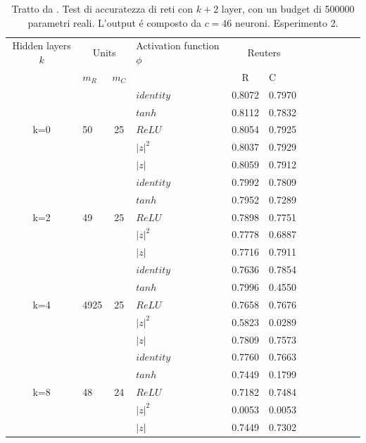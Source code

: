 \documentclass[a4paper,12pt]{report}
\begin{document}
 \newpage
 
 \begin{table}[h]
  \centering
  \begin{tabular}{cp{} cp{} cp{}   cp{} cp{} cp{}}
   \cline{1-6}
   Hidden layers $k$ & \multicolumn{2}{c}{Units} $p_R$ & Activation function $\phi$ & \multicolumn{2}{c}{Reuters}\\
   \cline{2-3} \cline{5-6}
   & $m_R$ & $m_C$ & & R & C \\
   \cline{1-6}
   & & & $identity$ & 0.8072 & 0.7970 \\
   \cline{4-6}
   & & & $tanh$ & 0.8112 & 0.7832 \\
   \cline{4-6}
   k=0 & 50 & 25 & $ReLU$ & 0.8054 & 0.7925 \\
   \cline{4-6}
   & & & $|z|^2$ & 0.8037 & 0.7929 \\
   \cline{4-6}
   & & & $|z|$ & 0.8059 & 0.7912 \\
   \cline{1-6}
   
   \cline{1-6}
   & & & $identity$ & 0.7992 & 0.7809 \\
   \cline{4-6}
   & & & $tanh$ & 0.7952 & 0.7289 \\
   \cline{4-6}
   k=2 & 49 & 25 & $ReLU$ & 0.7898 & 0.7751 \\
   \cline{4-6}
   & & & $|z|^2$ & 0.7778 & 0.6887 \\
   \cline{4-6}
   & & & $|z|$ & 0.7716 & 0.7911 \\
   \cline{1-6}
   
   \cline{1-6}
   & & & $identity$ & 0.7636 & 0.7854 \\
   \cline{4-6}
   & & & $tanh$ & 0.7996 & 0.4550 \\
   \cline{4-6}
   k=4 & 4925 & 25 & $ReLU$ & 0.7658 & 0.7676 \\
   \cline{4-6}
   & & & $|z|^2$ & 0.5823 & 0.0289 \\
   \cline{4-6}
   & & & $|z|$ & 0.7809 & 0.7573 \\
   \cline{1-6}
   
   \cline{1-6}
   & & & $identity$ & 0.7760 & 0.7663 \\
   \cline{4-6}
   & & & $tanh$ & 0.7449 & 0.1799 \\
   \cline{4-6}
   k=8 & 48 & 24 & $ReLU$ & 0.7182 & 0.7484 \\
   \cline{4-6}
   & & & $|z|^2$ & 0.0053 & 0.0053 \\
   \cline{4-6}
   & & & $|z|$ & 0.7449 & 0.7302 \\
   \cline{1-6}
      
  \end{tabular}
  \caption{Tratto da \cite{monning2018evaluation}. Test di accuratezza di reti con $k+2$ layer, con un budget di 500000 parametri reali. L'output \'e composto da $c=46$ neuroni. Esperimento 2.}
  \label{Reuters2Tab}
 \end{table}
  
\end{document}
